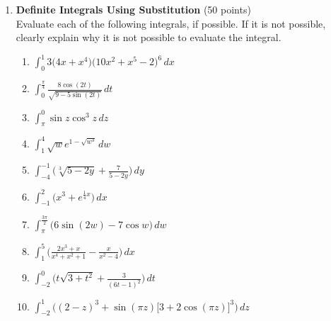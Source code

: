 \begin{enumerate}
  \item \textbf{Definite Integrals Using Substitution} (50 points)\\
  Evaluate each of the following integrals, if possible. If it is not possible, clearly explain why it is not possible to evaluate the integral.
  \begin{enumerate}
    \item $\displaystyle \int_0^1 3\bigl(4 x + x^4\bigr)\bigl(10 x^2 + x^5 - 2\bigr)^6 \,dx$
    \item $\displaystyle \int_0^{\frac{\pi}{4}} \frac{8 \cos(2 t)}{\sqrt{9 - 5 \sin(2 t)}} \,dt$
    \item $\displaystyle \int_\pi^0 \sin z \cos^3 z \,dz$
    \item $\displaystyle \int_1^4 \sqrt{w} e^{1 - \sqrt{w^3}} \,dw$
    \item $\displaystyle \int_{-4}^{-1} \biggl(\sqrt[3]{5 - 2 y} + \frac{7}{5 - 2 y}\biggr) \,dy$
    \item $\displaystyle \int_{-1}^2 \biggl(x^3 + e^{\frac{1}{4} x}\biggr) \,dx$
    \item $\displaystyle \int_\pi^{\frac{3 \pi}{2}} \bigl(6 \sin(2 w) - 7 \cos w\bigr) \,dw$
    \item $\displaystyle \int_1^5 \biggl(\frac{2 x^3 + x}{x^4 + x^2 + 1} - \frac{x}{x^2 - 4}\biggr) \,dx$
    \item $\displaystyle \int_{-2}^0 \biggl(t \sqrt{3 + t^2} + \frac{3}{(6 t - 1)^2}\biggr) \,dt$
    \item $\displaystyle \int_{-2}^1 \bigl((2 - z)^3 + \sin(\pi z)\bigl[3 + 2 \cos(\pi z)\bigr]^3\bigr) \,dz$
  \end{enumerate}
  \begin{subanswer}
  \end{subanswer}



\end{enumerate}
